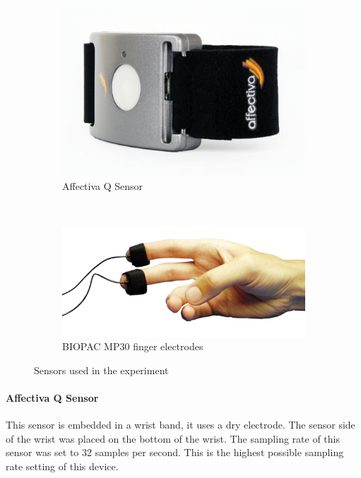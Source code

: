 \documentclass[11pt,leqno,a4paper]{report} %
\begin{document}
\begin{figure}[H]
\hspace*{-.1\textwidth}        \centering
        \begin{subfigure}[b]{0.6\textwidth}
                \includegraphics[width=\textwidth]{affectiva.jpg}
                \caption{Affectiva Q Sensor}
                \label{fig:aff}
        \end{subfigure}%
        ~ 
        \begin{subfigure}[b]{0.6\textwidth}
                \includegraphics[width=\textwidth]{bioelec.jpg}
                \caption{BIOPAC MP30 finger electrodes}
                \label{fig:bio}
        \end{subfigure}
        \caption{Sensors used in the experiment}\label{fig:animals}
\end{figure}


\paragraph{Affectiva Q Sensor}
This sensor is embedded in a wrist band, it uses a dry electrode. The sensor side of the wrist was placed on the bottom of the wrist. The sampling rate of this sensor was set to 32 samples per second. This is the highest possible sampling rate setting of this device.
\end{document}
